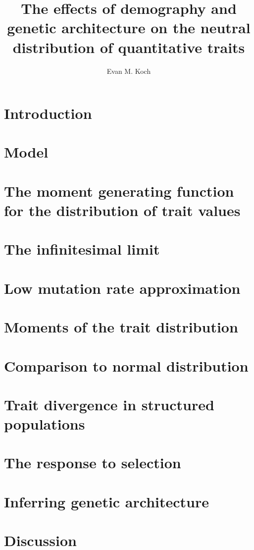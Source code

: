 \documentclass{article}
\begin{document}
\title{The effects of demography and genetic architecture on the neutral distribution of quantitative traits}
\author{Evan M. Koch}
\maketitle

\section{Introduction}

\section{Model}

\section{The moment generating function for the distribution of trait values}

\section{The infinitesimal limit}

\section{Low mutation rate approximation}

\section{Moments of the trait distribution}

\section{Comparison to normal distribution}

\section{Trait divergence in structured populations}

\section{The response to selection}

\section{Inferring genetic architecture}

\section{Discussion}

 

\clearpage
\end{document}
